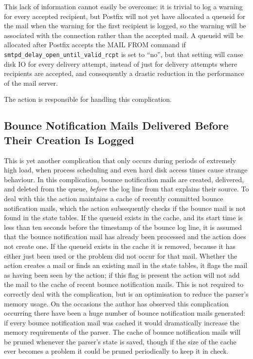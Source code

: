 This lack of information cannot easily be overcome: it is trivial to log a
warning for every accepted recipient, but Postfix will not yet have
allocated a queueid for the mail when the warning for the first recipient
is logged, so the warning will be associated with the connection rather
than the accepted mail.  A queueid will be allocated after Postfix accepts
the MAIL FROM command if \texttt{smtpd\_delay\_open\_until\_valid\_rcpt} is
set to ``no'', but that setting will cause disk IO for every delivery
attempt, instead of just for delivery attempts where recipients are
accepted, and consequently a drastic reduction in the performance of the
mail server.

The  action is responsible for handling this complication.

\subsection[Bounce Notification Mails Delivered Before Their Creation Is
Logged]{Bounce Notification Mails Delivered Before \newline{} Their
Creation Is Logged}

\label{Bounce notification mails delivered before their creation is logged}

This is yet another complication that only occurs during periods of
extremely high load, when process scheduling and even hard disk access
times cause strange behaviour.  In this complication, bounce notification
mails are created, delivered, and deleted from the queue, \textit{before\/}
the log line from  that explains their source.  To deal with
this the  action maintains a cache of recently committed
bounce notification mails, which the  action
subsequently checks if the bounce mail is not found in the state tables.
If the queueid exists in the cache, and its start time is less than ten
seconds before the timestamp of the bounce log line, it is assumed that the
bounce notification mail has already been processed and the
 action does not create one.  If the queueid exists
in the cache it is removed, because it has either just been used or the
problem did not occur for that mail.  Whether the 
action creates a mail or finds an existing mail in the state tables, it
flags the mail as having been seen by the  action;
if this flag is present the  action will not add the mail to
the cache of recent bounce notification mails.  This is not required to
correctly deal with the complication, but is an optimisation to reduce the
parser's memory usage.  On the occasions the author has observed this
complication occurring there have been a huge number of bounce notification
mails generated: if every bounce notification mail was cached it would
dramatically increase the memory requirements of the parser.  The cache of
bounce notification mails will be pruned whenever the parser's state is
saved, though if the size of the cache ever becomes a problem it could be
pruned periodically to keep it in check.

